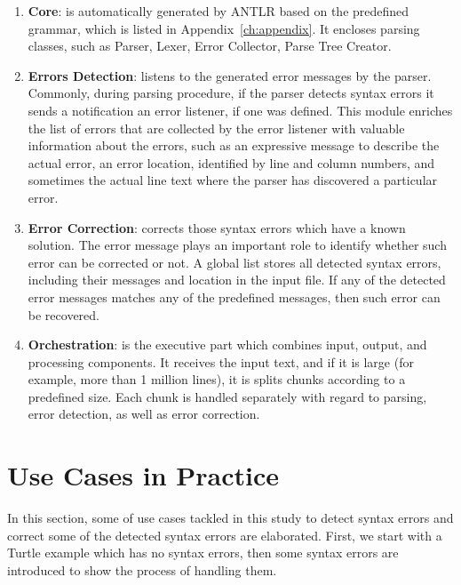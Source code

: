 \begin{enumerate}[]
 \item \textbf {Core}: is automatically generated by ANTLR based on the predefined grammar, which is listed in Appendix~\ref{ch:appendix}. 
 It encloses parsing classes, such as Parser, Lexer, Error Collector, Parse Tree Creator.   
\item \textbf{Errors Detection}: listens to the generated error messages by the parser. 
Commonly, during parsing procedure, if the parser detects syntax errors it sends a notification an error listener, if one was defined. 
This module enriches the list of errors that are collected by the error listener with valuable information about the errors, such as an expressive message to describe the actual error, an error location, identified by line and column numbers, and sometimes the actual line text where the parser has discovered a particular error.

\item \textbf {Error Correction}: corrects those syntax errors which have a known solution. 
The error message plays an important role to identify whether such error can be corrected or not. 
A global list stores all detected syntax errors, including their messages and location in the input file. %
If any of the detected error messages matches any of the predefined messages, then such error can be recovered.

\item \textbf{Orchestration}:  is the executive part which combines input, output, and processing components. 
It receives the input text, and if it is large (for example, more than 1 million lines), it is splits chunks according to a predefined size. 
Each chunk is handled separately with regard to parsing, error detection, as well as error correction.

\end{enumerate} 


\section{Use Cases in Practice}
In this section, some of use cases tackled in this study to detect syntax errors and correct some of the detected syntax errors are elaborated. 
First, we start with a Turtle example which has no syntax errors, then some syntax errors are introduced to show the process of handling them. 

